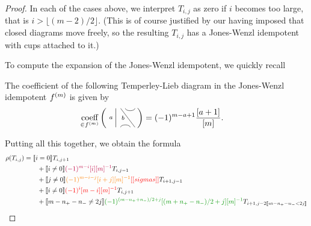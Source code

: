 \documentclass{article}
\begin{document}
\begin{proof}
In each of the cases above, we interpret $T_{i,j}$ as zero if $i$ becomes too large, that is $i > \lfloor (m-2)/2 \rfloor$. (This is of course justified by our having imposed that closed diagrams move freely, so the resulting $T_{i,j}$ has a Jones-Wenzl idempotent with cups attached to it.)

To compute the expansion of the Jones-Wenzl idempotent, we quickly recall
\begin{lem}
The coefficient of the following Temperley-Lieb diagram in the Jones-Wenzl idempotent $f^{(m)}$ is given by
\begin{align*}
\underset{\in \jw{m}}{\textrm{coeff}}
\left(
\begin{tikzpicture}[baseline = -.1cm, yscale=-.5]
	\draw (-.5,-.8)--(-.5,.8);
	\draw (-.3,.8) arc (-180:0:.2cm);
	\draw (-.3,-.8)--(.3,.8);
	\draw (-.1,-.8) arc (180:0:.2cm);
	\node at (-.7,0) {{\scriptsize{$a$}}};
	\node at (-.2,0) {{\scriptsize{$b$}}};
    \node at (.2,0) {$\phantom{c}$};
\end{tikzpicture}
\right)
& =
(-1)^{m-a+1}\frac{[a+1]}{[m]}.
\end{align*}
\end{lem}


Putting all this together, we obtain the formula
\begin{align*}
\rho(T_{i,j}) & =
\truth{i = 0} T_{i, j + 1} \\
& \qquad +
\truth{i \neq 0} \textcolor{purple}{(-1)^{m-i} [i][m]^{-1}} T_{i,j-1} \\
& \qquad +
\truth{j \neq 0}\textcolor{orange}{(-1)^{m-i-j} [i+j][m]^{-1}} \nn{sigmas} T_{i+1, j-1} \\
& \qquad +
\truth{i \neq 0}\textcolor{red}{(-1)^{i}  [m-i][m]^{-1}} T_{i, j + 1} \\
& \qquad +
\truth{m-n_+-n_-\neq 2j} \textcolor{DarkGreen}{(-1)^{(m - n_+ + n_-)/2 + j} [(m + n_+ - n_-)/2 + j][m]^{-1}} T_{i+1,j-2\truth{m-n_+-n_- < 2j}}
\end{align*}


\end{proof}
\end{document}
